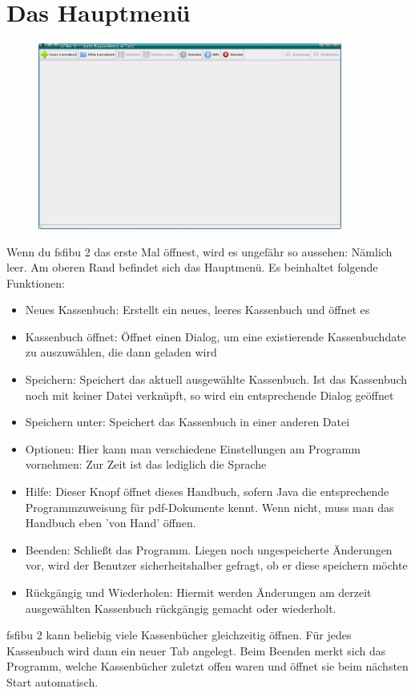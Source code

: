 \documentclass[a4paper,10pt,halfparskip,oneside,smallheadings]{scrbook}
\begin{document}
\section{Das Hauptmenü}
\begin{figure}[h]
	\includegraphics[width=10cm]{emptyprogram.jpg} 
\end{figure}
Wenn du fsfibu 2 das erste Mal öffnest, wird es ungefähr so aussehen: Nämlich leer. Am oberen Rand befindet sich das Hauptmenü. Es beinhaltet folgende Funktionen:
\begin{itemize}
 \item Neues Kassenbuch: Erstellt ein neues, leeres Kassenbuch und öffnet es
 \item Kassenbuch öffnet: Öffnet einen Dialog, um eine existierende Kassenbuchdate zu auszuwählen, die dann geladen wird
 \item Speichern: Speichert das aktuell ausgewählte Kassenbuch. Ist das Kassenbuch noch mit keiner Datei verknüpft, so wird ein entsprechende Dialog geöffnet
 \item Speichern unter: Speichert das Kassenbuch in einer anderen Datei
 \item Optionen: Hier kann man verschiedene Einstellungen am Programm vornehmen: Zur Zeit ist das lediglich die Sprache
 \item Hilfe: Dieser Knopf öffnet dieses Handbuch, sofern Java die entsprechende Programmzuweisung für pdf-Dokumente kennt. Wenn nicht, muss man das Handbuch eben 'von Hand' öffnen.
 \item Beenden: Schließt das Programm. Liegen noch ungespeicherte Änderungen vor, wird der Benutzer sicherheitshalber gefragt, ob er diese speichern möchte
 \item Rückgängig und Wiederholen: Hiermit werden Änderungen am derzeit ausgewählten Kassenbuch rückgängig gemacht oder wiederholt.
\end{itemize}

fsfibu 2 kann beliebig viele Kassenbücher gleichzeitig öffnen. Für jedes Kassenbuch wird dann ein neuer Tab angelegt. Beim Beenden merkt sich das Programm, welche Kassenbücher zuletzt offen waren und öffnet sie beim nächsten Start automatisch.
\end{document}
